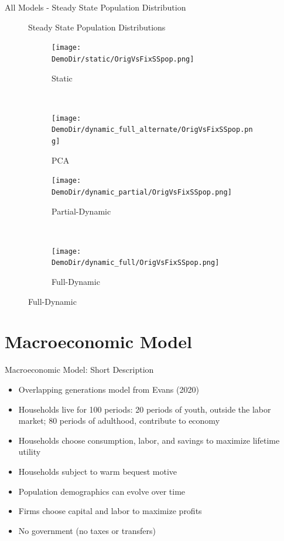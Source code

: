 \documentclass[12pt]{beamer}
\newcommand*{\DemoDir}{../code/Rick/OUTPUT/Demographics}
\begin{document}
\begin{frame}{All Models - Steady State Population Distribution}

	\begin{figure}[H]
		Steady State Population Distributions
		\begin{subfigure}{0.5\textwidth}
			\centering
			\texttt{[image: \\DemoDir/static/OrigVsFixSSpop.png]}
			\vspace{-5mm}
			\caption{Static}
		\end{subfigure}%
		~ %
		\begin{subfigure}{0.5\textwidth}
			\centering
			\texttt{[image: \\DemoDir/dynamic\_full\_alternate/OrigVsFixSSpop.png]}
			\vspace{-5mm}
			\caption{PCA}
		\end{subfigure}%
		\newline
		\begin{subfigure}{0.5\textwidth}
			\centering
			\texttt{[image: \\DemoDir/dynamic\_partial/OrigVsFixSSpop.png]}
			\vspace{-5mm}
			\caption{Partial-Dynamic}
		\end{subfigure}%
		~ %
		\begin{subfigure}{0.5\textwidth}
			\centering
			\texttt{[image: \\DemoDir/dynamic\_full/OrigVsFixSSpop.png]}
			\vspace{-5mm}
			\caption{Full-Dynamic}
		\end{subfigure}%
	\end{figure}

\end{frame}

\section{Macroeconomic Model}

\begin{frame}{Macroeconomic Model: Short Description}
	\begin{itemize}
		\item Overlapping generations model from Evans (2020)
		\item Households live for 100 periods: 20 periods of youth, outside the labor market; 80 periods of adulthood, contribute to economy
		\item Households choose consumption, labor, and savings to maximize lifetime utility
		\item Households subject to warm bequest motive
		\item Population demographics can evolve over time
		\item Firms choose capital and labor to maximize profits
		\item No government (no taxes or transfers)
	\end{itemize}
\end{frame}
\end{document}
